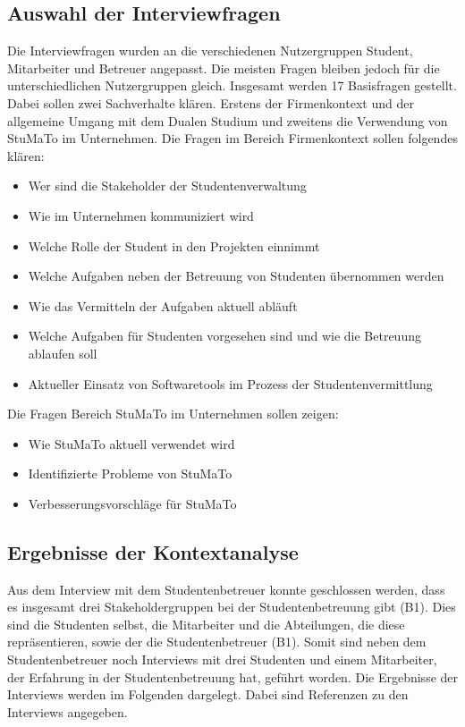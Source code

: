 \documentclass[
  12pt,
  ngerman,
  a4paper,
]{article}
\providecommand{\tightlist}{%
  \setlength{\itemsep}{0pt}\setlength{\parskip}{0pt}}
\begin{document}
\hypertarget{auswahl-der-interviewfragen}{%
\subsection{Auswahl der
Interviewfragen}\label{auswahl-der-interviewfragen}}

Die Interviewfragen wurden an die verschiedenen Nutzergruppen Student,
Mitarbeiter und Betreuer angepasst. Die meisten Fragen bleiben jedoch
für die unterschiedlichen Nutzergruppen gleich. Insgesamt werden 17
Basisfragen gestellt. Dabei sollen zwei Sachverhalte klären. Erstens der
Firmenkontext und der allgemeine Umgang mit dem Dualen Studium und
zweitens die Verwendung von StuMaTo im Unternehmen. Die Fragen im
Bereich Firmenkontext sollen folgendes klären:

\begin{itemize}
\tightlist
\item
  Wer sind die Stakeholder der Studentenverwaltung
\item
  Wie im Unternehmen kommuniziert wird
\item
  Welche Rolle der Student in den Projekten einnimmt
\item
  Welche Aufgaben neben der Betreuung von Studenten übernommen werden
\item
  Wie das Vermitteln der Aufgaben aktuell abläuft
\item
  Welche Aufgaben für Studenten vorgesehen sind und wie die Betreuung
  ablaufen soll
\item
  Aktueller Einsatz von Softwaretools im Prozess der
  Studentenvermittlung
\end{itemize}

Die Fragen Bereich StuMaTo im Unternehmen sollen zeigen:

\begin{itemize}
\tightlist
\item
  Wie StuMaTo aktuell verwendet wird
\item
  Identifizierte Probleme von StuMaTo
\item
  Verbesserungsvorschläge für StuMaTo
\end{itemize}

\hypertarget{ergebnisse-der-kontextanalyse}{%
\subsection{Ergebnisse der
Kontextanalyse}\label{ergebnisse-der-kontextanalyse}}

Aus dem Interview mit dem Studentenbetreuer konnte geschlossen werden,
dass es insgesamt drei Stakeholdergruppen bei der Studentenbetreuung
gibt (B1). Dies sind die Studenten selbst, die Mitarbeiter und die
Abteilungen, die diese repräsentieren, sowie der die Studentenbetreuer
(B1). Somit sind neben dem Studentenbetreuer noch Interviews mit drei
Studenten und einem Mitarbeiter, der Erfahrung in der Studentenbetreuung
hat, geführt worden. Die Ergebnisse der Interviews werden im Folgenden
dargelegt. Dabei sind Referenzen zu den Interviews angegeben.
\end{document}
